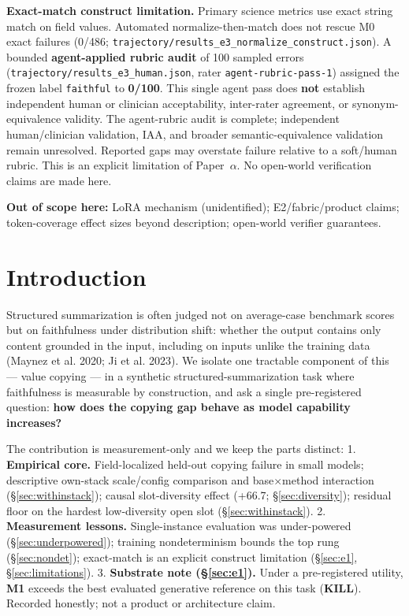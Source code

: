 \documentclass[11pt]{article}
\begin{document}
\textbf{Exact-match construct limitation.} Primary science metrics use exact string match on field values. Automated normalize-then-match does not rescue M0 exact failures (0/486; \texttt{trajectory/results\_e3\_normalize\_construct.json}). A bounded \textbf{agent-applied rubric audit} of 100 sampled errors (\texttt{trajectory/results\_e3\_human.json}, rater \texttt{agent-rubric-pass-1}) assigned the frozen label \texttt{faithful} to \textbf{0/100}. This single agent pass does \textbf{not} establish independent human or clinician acceptability, inter-rater agreement, or synonym-equivalence validity. The agent-rubric audit is complete; independent human/clinician validation, IAA, and broader semantic-equivalence validation remain unresolved. Reported gaps may overstate failure relative to a soft/human rubric. This is an explicit limitation of Paper~$\alpha$. No open-world verification claims are made here.

\textbf{Out of scope here:} LoRA mechanism (unidentified); E2/fabric/product claims; token-coverage effect sizes beyond description; open-world verifier guarantees.

\section{Introduction}\label{sec:intro}

Structured summarization is often judged not on average-case benchmark scores but on faithfulness under distribution shift: whether the output contains only content grounded in the input, including on inputs unlike the training data (Maynez et al. 2020; {Ji et al.} 2023). We isolate one tractable component of this --- value copying --- in a synthetic structured-summarization task where faithfulness is measurable by construction, and ask a single pre-registered question: \textbf{how does the copying gap behave as model capability increases?}

The contribution is measurement-only and we keep the parts distinct: 1. \textbf{Empirical core.} Field-localized held-out copying failure in small models; descriptive own-stack scale/config comparison and base$\times$method interaction (\S\ref{sec:withinstack}); causal slot-diversity effect (+66.7; \S\ref{sec:diversity}); residual floor on the hardest low-diversity open slot (\S\ref{sec:withinstack}). 2. \textbf{Measurement lessons.} Single-instance evaluation was under-powered (\S\ref{sec:underpowered}); training nondeterminism bounds the top rung (\S\ref{sec:nondet}); exact-match is an explicit construct limitation (\S\ref{sec:e1}, \S\ref{sec:limitations}). 3. \textbf{Substrate note (\S\ref{sec:e1}).} Under a pre-registered utility, \textbf{M1} exceeds the best evaluated generative reference on this task (\textbf{KILL}). Recorded honestly; not a product or architecture claim.
\end{document}
